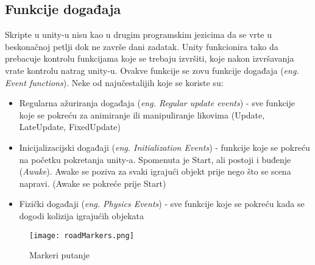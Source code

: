 \subsection{Funkcije događaja}
Skripte u unity-u nisu kao u drugim programskim jezicima da se vrte u beskonačnoj petlji dok ne završe dani zadatak. Unity funkcionira tako da prebacuje kontrolu funkcijama koje se trebaju izvršiti, koje nakon izvršavanja vrate kontrolu natrag unity-u. Ovakve funkcije se zovu funkcije događaja (\emph{eng. Event functions}). Neke od najučestalijih koje se koriste su:
\begin{itemize} 
	\item Regularna ažuriranja događaja (\emph{eng. Regular update events}) - sve funkcije koje se pokreću za animiranje ili manipuliranje likovima (Update, LateUpdate, FixedUpdate)
	\item Inicijalizacijski događaji (\emph{eng. Initialization Events}) - funkcije koje se pokreću na početku pokretanja unity-a. Spomenuta je Start, ali postoji i buđenje (\emph{Awake}). Awake se poziva za svaki igrajući objekt prije nego što se scena napravi. (Awake se pokreće prije Start)
	\item Fizički događaji (\emph{eng. Physics Events}) - sve funkcije koje se pokreću kada se dogodi kolizija igrajućih objekata
\end{itemize}
\begin{figure}[h]
	\texttt{[image: roadMarkers.png]}
	\centering
	\caption{Markeri putanje}
	\label{fig:markeriPutanje}
\end{figure}
